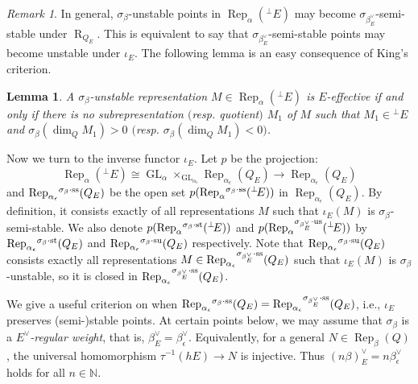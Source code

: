 \documentclass{amsart}
\newtheorem{lemma}[theorem]{Lemma}
\theoremstyle{definition}
\theoremstyle{remark}
\newtheorem{remark}[theorem]{Remark}
\numberwithin{equation}{section}
\begin{document}
\begin{remark} In general, $\sigma_\beta$-unstable points in ${\operatorname{Rep}}_\alpha({{^\perp}\!} E)$ may become $\sigma_{\beta_E^\vee}$-semi-stable under ${\operatorname{R}}_{Q_E}$. This is equivalent to say that $\sigma_{\beta_E^\vee}$-semi-stable points may become unstable under $\iota_E$. The following lemma is an easy consequence of King's criterion.
\end{remark}

\begin{lemma}
A $\sigma_\beta$-unstable representation $M\in {\operatorname{Rep}}_\alpha({{^\perp}\!} E)$ is $E$-effective
if and only if there is no subrepresentation $($resp. quotient$)$ $M_1$ of $M$ such that $M_1\in{{^\perp}\!} E$ and $\sigma_\beta(\dim_QM_1)>0$ $($resp. $\sigma_\beta(\dim_QM_1)<0)$.
\end{lemma}

Now we turn to the inverse functor $\iota_E$. Let $p$ be the projection: $${\operatorname{Rep}}_\alpha({{^\perp}\!} E)\cong{\operatorname{GL}}_\alpha\times_{{\operatorname{GL}}_{\alpha_\epsilon}}{\operatorname{Rep}}_{\alpha_\epsilon}(Q_E)\to{\operatorname{Rep}}_{\alpha_\epsilon}(Q_E)$$ and ${\operatorname{Rep}}_{\alpha_\epsilon}{^{\sigma_{{\beta}}\cdot{\rm {ss}}}}(Q_E)$ be the open set $p({\operatorname{Rep}}_\alpha{^{\sigma_{{\beta}}\cdot{\rm {ss}}}}({{^\perp}\!} E))$ in ${\operatorname{Rep}}_{\alpha_\epsilon}(Q_E)$. By definition, it consists exactly of all representations $M$ such that $\iota_E(M)$ is $\sigma_\beta$-semi-stable. We also denote $p({\operatorname{Rep}}_\alpha{^{\sigma_{{\beta}}\cdot{\rm {st}}}}({{^\perp}\!} E))$ and $p({\operatorname{Rep}}_\alpha{^{\sigma_{{\beta_E^\vee}}\cdot{\rm {us}}}}({{^\perp}\!} E))$ by ${\operatorname{Rep}}_{\alpha_\epsilon}{^{\sigma_{{\beta}}\cdot{\rm {st}}}}(Q_E)$ and ${\operatorname{Rep}}_{\alpha_\epsilon}{^{\sigma_{{\beta}}\cdot{\rm {su}}}}(Q_E)$ respectively. Note that ${\operatorname{Rep}}_{\alpha_\epsilon}{^{\sigma_{{\beta}}\cdot{\rm {su}}}}(Q_E)$ consists exactly all representations $M\in{\operatorname{Rep}}_{\alpha_\epsilon}{^{\sigma_{{\beta_E^\vee}}\cdot{\rm {ss}}}}(Q_E)$ such that $\iota_E(M)$ is $\sigma_\beta$-unstable, so it is closed in ${\operatorname{Rep}}_{\alpha_\epsilon}{^{\sigma_{{\beta_E^\vee}}\cdot{\rm {ss}}}}(Q_E)$.

We give a useful criterion on when ${\operatorname{Rep}}_{\alpha_\epsilon}{^{\sigma_{{\beta}}\cdot{\rm {ss}}}}(Q_E)={\operatorname{Rep}}_{\alpha_\epsilon}{^{\sigma_{{\beta_E^\vee}}\cdot{\rm {ss}}}}(Q_E)$, i.e., $\iota_E$ preserves (semi-)stable points. At certain points below, we may assume that $\sigma_\beta$ is a {\em $E^\vee$-regular weight}, that is, $\beta_E^\vee=\beta_\epsilon^\vee$. Equivalently, for a general $N\in{\operatorname{Rep}}_{\beta}(Q)$, the universal homomorphism $\tau^{-1}(hE)\to N$ is injective. Thus $(n\beta)_E^\vee=n\beta_\epsilon^\vee$ holds for all $n\in{\mathbb{{N}}}$.
\end{document}
